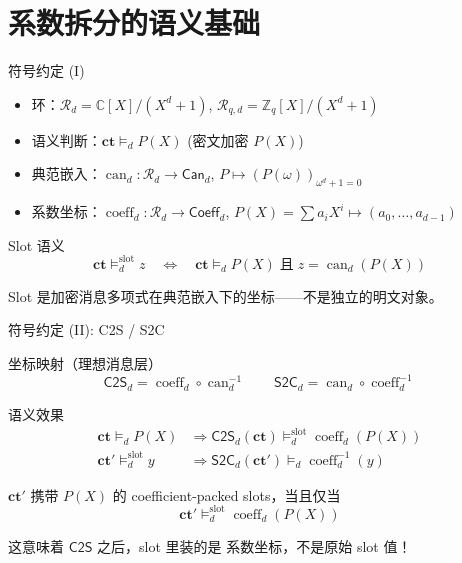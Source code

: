 \documentclass[aspectratio=169, 10pt, xcolor=svgnames, table, UTF8]{ctexbeamer}
\newcommand{\vDashsym}{\mathrel{\vDash}}
\newcommand{\can}{\operatorname{can}}
\newcommand{\coeffvec}{\operatorname{coeff}}
\newcommand{\cots}{\mathsf{C2S}}
\newcommand{\stoc}{\mathsf{S2C}}
\newcommand{\ringR}{\mathcal{R}}
\newcommand{\ringZ}{\mathbb{Z}}
\newcommand{\ringC}{\mathbb{C}}
\newcommand{\canSpace}{\mathsf{Can}}
\newcommand{\coeffSpace}{\mathsf{Coeff}}
\begin{document}
\section{系数拆分的语义基础}

\begin{frame}{符号约定 (I)}
  \begin{itemize}
    \item 环：\(\ringR_d = \ringC[X]/(X^d+1)\), \quad \(\ringR_{q,d} = \ringZ_q[X]/(X^d+1)\)
    
    \item 语义判断：\(\mathbf{ct} \vDashsym_{d} P(X)\) \quad (密文加密 \(P(X)\))
    
    \item 典范嵌入：\(\can_d : \ringR_d \to \canSpace_d\), \quad \(P \mapsto (P(\omega))_{\omega^d+1=0}\)
    
    \item 系数坐标：\(\coeffvec_d : \ringR_d \to \coeffSpace_d\), \quad \(P(X) = \sum a_i X^i \mapsto (a_0,\ldots,a_{d-1})\)
  \end{itemize}
  
  \pause
  
  \begin{block}{Slot 语义}
    \[
    \mathbf{ct} \vDashsym_d^{\mathrm{slot}} z
    \quad\Longleftrightarrow\quad
    \mathbf{ct} \vDashsym_d P(X) \;\text{且}\; z = \can_d(P(X))
    \]
    
    Slot 是加密消息多项式在典范嵌入下的坐标——不是独立的明文对象。
  \end{block}
\end{frame}

\begin{frame}{符号约定 (II): C2S / S2C}
  \begin{block}{坐标映射（理想消息层）}
    \[
    \boxed{\cots_d = \coeffvec_d \circ \can_d^{-1}}
    \qquad
    \boxed{\stoc_d = \can_d \circ \coeffvec_d^{-1}}
    \]
  \end{block}
  
  \pause
  
  \begin{block}{语义效果}
    \vspace{-0.3cm}
    \begin{align*}
      \mathbf{ct} \vDashsym_d P(X)
      &\Longrightarrow
      \cots_d(\mathbf{ct}) \vDashsym_d^{\mathrm{slot}} \coeffvec_d(P(X))
      \\[0.2cm]
      \mathbf{ct}' \vDashsym_d^{\mathrm{slot}} y
      &\Longrightarrow
      \stoc_d(\mathbf{ct}') \vDashsym_d \coeffvec_d^{-1}(y)
    \end{align*}
  \end{block}
  
  \pause
  
  \begin{definition}
    \(\mathbf{ct}'\) 携带 \(P(X)\) 的 \alert{coefficient-packed slots}，当且仅当
    \[
    \mathbf{ct}' \vDashsym_d^{\mathrm{slot}} \coeffvec_d(P(X))
    \]
  \end{definition}
  
  这意味着 \(\cots\) 之后，slot 里装的是 \alert{系数坐标}，不是原始 slot 值！
\end{frame}
\end{document}
